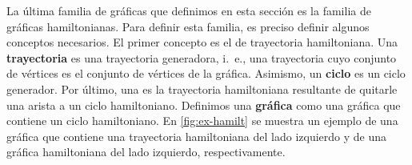 \newpage

La \'ultima familia de gr\'aficas que definimos en esta secci\'on es la familia
de gr\'aficas hamiltonianas. Para definir esta familia, es preciso definir
algunos conceptos necesarios. El primer concepto es el de trayectoria
hamiltoniana. Una \textbf{trayectoria}
 es una
trayectoria generadora, i.~e., una trayectoria cuyo conjunto de v\'ertices es el
conjunto de v\'ertices de la gr\'afica. Asimismo, un \textbf{ciclo}
 es un ciclo generador.
Por \'ultimo, una  es la trayectoria hamiltoniana
resultante de quitarle una arista a un ciclo hamiltoniano. Definimos una
\textbf{gr\'afica}
 como una
gr\'afica que contiene un ciclo hamiltoniano. En \cref{fig:ex-hamilt} se muestra
un ejemplo de una gr\'afica que contiene una trayectoria hamiltoniana del lado
izquierdo y de una gr\'afica hamiltoniana del lado izquierdo, respectivamente.

